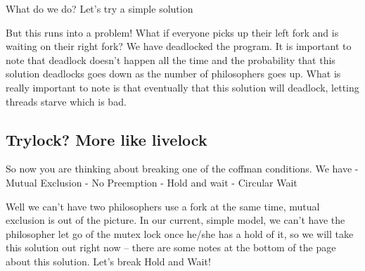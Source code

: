 What do we do? Let's try a simple solution

\begin{Shaded}
\begin{Highlighting}[]
     \NormalTok{\}}
\NormalTok{\}}
\end{Highlighting}
\end{Shaded}

But this runs into a problem! What if everyone picks up their left fork
and is waiting on their right fork? We have deadlocked the program. It
is important to note that deadlock doesn't happen all the time and the
probability that this solution deadlocks goes down as the number of
philosophers goes up. What is really important to note is that
eventually that this solution will deadlock, letting threads starve
which is bad.

\subsection{Trylock? More like
livelock}\label{trylock-more-like-livelock}

So now you are thinking about breaking one of the coffman conditions. We
have - Mutual Exclusion - No Preemption - Hold and wait - Circular Wait

Well we can't have two philosophers use a fork at the same time, mutual
exclusion is out of the picture. In our current, simple model, we can't
have the philosopher let go of the mutex lock once he/she has a hold of
it, so we will take this solution out right now -- there are some notes
at the bottom of the page about this solution. Let's break Hold and
Wait!

\begin{Shaded}
\begin{Highlighting}[]
           
          \NormalTok{\}}
     \NormalTok{\}}
\NormalTok{\}}
\end{Highlighting}
\end{Shaded}

